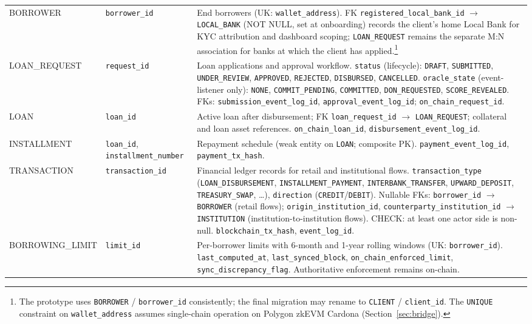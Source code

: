 \documentclass[12pt,a4paper]{report}
\begin{document}
\begin{table}[H]
\begin{tabular}{@{}p{2.6cm}p{3.4cm}p{7.0cm}@{}}
BORROWER & \texttt{borrower\_id} & End borrowers (UK: \texttt{wallet\_address}). FK \texttt{registered\_local\_bank\_id} $\to$ \texttt{LOCAL\_BANK} (NOT NULL, set at onboarding) records the client's home Local Bank for KYC attribution and dashboard scoping; \texttt{LOAN\_REQUEST} remains the separate M:N association for banks at which the client has applied.\footnote{The prototype uses \texttt{BORROWER} / \texttt{borrower\_id} consistently; the final migration may rename to \texttt{CLIENT} / \texttt{client\_id}. The \texttt{UNIQUE} constraint on \texttt{wallet\_address} assumes single-chain operation on Polygon zkEVM Cardona (Section~\ref{sec:bridge}).} \\
LOAN\_REQUEST & \texttt{request\_id} & Loan applications and approval workflow. \texttt{status} (lifecycle): \texttt{DRAFT}, \texttt{SUBMITTED}, \texttt{UNDER\_REVIEW}, \texttt{APPROVED}, \texttt{REJECTED}, \texttt{DISBURSED}, \texttt{CANCELLED}. \texttt{oracle\_state} (event-listener only): \texttt{NONE}, \texttt{COMMIT\_PENDING}, \texttt{COMMITTED}, \texttt{DON\_REQUESTED}, \texttt{SCORE\_REVEALED}. FKs: \texttt{submission\_event\_log\_id}, \texttt{approval\_event\_log\_id}; \texttt{on\_chain\_request\_id}. \\
LOAN & \texttt{loan\_id} & Active loan after disbursement; FK \texttt{loan\_request\_id} $\to$ \texttt{LOAN\_REQUEST}; collateral and loan asset references. \texttt{on\_chain\_loan\_id}, \texttt{disbursement\_event\_log\_id}. \\
INSTALLMENT & \texttt{loan\_id}, \texttt{installment\_number} & Repayment schedule (weak entity on \texttt{LOAN}; composite PK). \texttt{payment\_event\_log\_id}, \texttt{payment\_tx\_hash}. \\
TRANSACTION & \texttt{transaction\_id} & Financial ledger records for retail and institutional flows. \texttt{transaction\_type} (\texttt{LOAN\_DISBURSEMENT}, \texttt{INSTALLMENT\_PAYMENT}, \texttt{INTERBANK\_TRANSFER}, \texttt{UPWARD\_DEPOSIT}, \texttt{TREASURY\_SWAP}, \ldots), \texttt{direction} (\texttt{CREDIT}/\texttt{DEBIT}). Nullable FKs: \texttt{borrower\_id} $\to$ \texttt{BORROWER} (retail flows); \texttt{origin\_institution\_id}, \texttt{counterparty\_institution\_id} $\to$ \texttt{INSTITUTION} (institution-to-institution flows). CHECK: at least one actor side is non-null. \texttt{blockchain\_tx\_hash}, \texttt{event\_log\_id}. \\
BORROWING\_LIMIT & \texttt{limit\_id} & Per-borrower limits with 6-month and 1-year rolling windows (UK: \texttt{borrower\_id}). \texttt{last\_computed\_at}, \texttt{last\_synced\_block}, \texttt{on\_chain\_enforced\_limit}, \texttt{sync\_discrepancy\_flag}. Authoritative enforcement remains on-chain. \\

\end{tabular}
\end{table}
\end{document}
